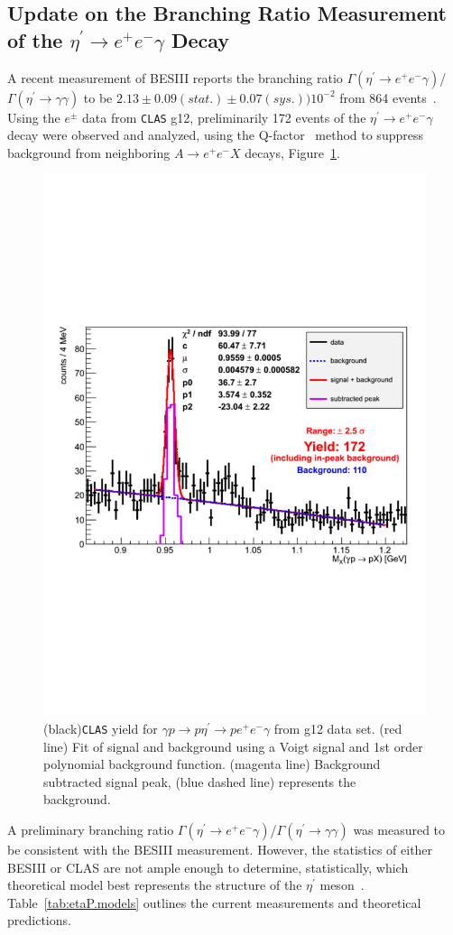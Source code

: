 \documentclass[epj]{webofc}
\begin{document}
\subsection{Update on the Branching Ratio Measurement  of the $\eta^\prime \rightarrow e^+e^-\gamma$ Decay}
A recent measurement of BESIII reports the branching ratio $\Gamma(\eta^{\prime} \to  e^+ e^-  \gamma)$/$\Gamma(\eta^{\prime} \to  \gamma  \gamma)$ to be $2.13\pm0.09(stat.)\pm0.07(sys.))10^{-2}$ from 864 events~\cite{bib7}.  Using the $e^{\pm}$ data from \textsc{\texttt{CLAS}} g12, preliminarily 172 events of the $\eta^{\prime} \to  e^+ e^-  \gamma$ decay were observed and analyzed, using the Q-factor~\cite{bib8} method to suppress background from neighboring $A \to e^+ e^-  X$ decays, Figure~\ref{fig:etaP_ff}.
\begin{figure}[h!]
\centerline{\includegraphics[width=160 pt]{figures/etaPeeg_mimass.pdf}}
\caption{(black)\textsc{\texttt{CLAS}} yield for $\gamma p \to p \eta^{\prime}  \to p e^+ e^- \gamma $ from g12 data set. (red line) Fit of signal and background using a Voigt signal and 1st order polynomial background function. (magenta line) Background subtracted signal peak, (blue dashed line) represents the background.}
\label{fig:etaP_ff}
\end{figure}
  A preliminary branching ratio $\Gamma(\eta^{\prime} \to  e^+ e^-  \gamma)$/$\Gamma(\eta^{\prime} \to  \gamma  \gamma)$ was measured to be consistent with the BESIII measurement. However, the statistics of either BESIII or CLAS are not ample enough to determine, statistically, which theoretical model best represents the structure of the $\eta^{\prime}$ meson~\cite{bib10,bib11,bib12}. Table~\ref{tab:etaP.models} outlines the current measurements and theoretical predictions.

\FloatBarrier
\end{document}
